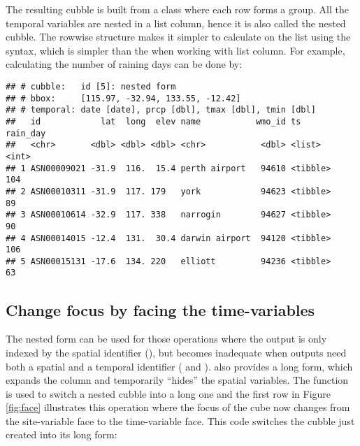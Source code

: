 \documentclass{article}
\newenvironment{Shaded}{\begin{snugshade}}{\end{snugshade}}
\newcommand{\AttributeTok}[1]{\textcolor[rgb]{0.77,0.63,0.00}{#1}}
\newcommand{\DecValTok}[1]{\textcolor[rgb]{0.00,0.00,0.81}{#1}}
\newcommand{\ErrorTok}[1]{\textcolor[rgb]{0.64,0.00,0.00}{\textbf{#1}}}
\newcommand{\FunctionTok}[1]{\textcolor[rgb]{0.00,0.00,0.00}{#1}}
\newcommand{\NormalTok}[1]{#1}
\newcommand{\SpecialCharTok}[1]{\textcolor[rgb]{0.00,0.00,0.00}{#1}}
\begin{document}
The resulting cubble is built from a  class where each row forms a group. All the temporal variables are nested in a list column, hence it is also called the nested cubble. The rowwise structure makes it simpler to calculate on the list using the  syntax, which is simpler than the  when working with list column. For example, calculating the number of raining days can be done by:

\begin{Shaded}
\end{Shaded}

\begin{verbatim}
## # cubble:   id [5]: nested form
## # bbox:     [115.97, -32.94, 133.55, -12.42]
## # temporal: date [date], prcp [dbl], tmax [dbl], tmin [dbl]
##   id            lat  long  elev name           wmo_id ts       rain_day
##   <chr>       <dbl> <dbl> <dbl> <chr>           <dbl> <list>      <int>
## 1 ASN00009021 -31.9  116.  15.4 perth airport   94610 <tibble>      104
## 2 ASN00010311 -31.9  117. 179   york            94623 <tibble>       89
## 3 ASN00010614 -32.9  117. 338   narrogin        94627 <tibble>       90
## 4 ASN00014015 -12.4  131.  30.4 darwin airport  94120 <tibble>      106
## 5 ASN00015131 -17.6  134. 220   elliott         94236 <tibble>       63
\end{verbatim}

\hypertarget{change-focus-by-facing-the-time-variables}{%
\subsection{Change focus by facing the time-variables}\label{change-focus-by-facing-the-time-variables}}

The nested form can be used for those operations where the output is only indexed by the spatial identifier (), but becomes inadequate when outputs need both a spatial and a temporal identifier ( and ).  also provides a long form, which expands the  column and temporarily ``hides'' the spatial variables. The function  is used to switch a nested cubble into a long one and the first row in Figure \ref{fig:face} illustrates this operation where the focus of the cube now changes from the site-variable face to the time-variable face. This code switches the cubble just created into its long form:
\end{document}
